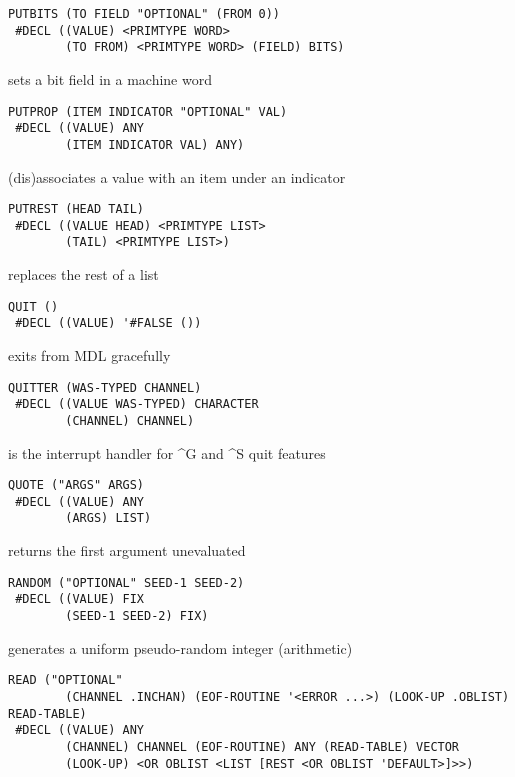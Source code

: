 \documentclass[a4paper]{scrbook}
\begin{document}
\begin{verbatim}
PUTBITS (TO FIELD "OPTIONAL" (FROM 0))
 #DECL ((VALUE) <PRIMTYPE WORD>
        (TO FROM) <PRIMTYPE WORD> (FIELD) BITS)
\end{verbatim}

sets a bit field in a machine word

\begin{verbatim}
PUTPROP (ITEM INDICATOR "OPTIONAL" VAL)
 #DECL ((VALUE) ANY
        (ITEM INDICATOR VAL) ANY)
\end{verbatim}

(dis)associates a value with an item under an indicator

\begin{verbatim}
PUTREST (HEAD TAIL)
 #DECL ((VALUE HEAD) <PRIMTYPE LIST>
        (TAIL) <PRIMTYPE LIST>)
\end{verbatim}

replaces the rest of a list

\begin{verbatim}
QUIT ()
 #DECL ((VALUE) '#FALSE ())
\end{verbatim}

exits from MDL gracefully

\begin{verbatim}
QUITTER (WAS-TYPED CHANNEL)
 #DECL ((VALUE WAS-TYPED) CHARACTER
        (CHANNEL) CHANNEL)
\end{verbatim}

is the interrupt handler for \^{}G and \^{}S quit features

\begin{verbatim}
QUOTE ("ARGS" ARGS)
 #DECL ((VALUE) ANY
        (ARGS) LIST)
\end{verbatim}

returns the first argument unevaluated

\begin{verbatim}
RANDOM ("OPTIONAL" SEED-1 SEED-2)
 #DECL ((VALUE) FIX
        (SEED-1 SEED-2) FIX)
\end{verbatim}

generates a uniform pseudo-random integer (arithmetic)

\begin{verbatim}
READ ("OPTIONAL"
        (CHANNEL .INCHAN) (EOF-ROUTINE '<ERROR ...>) (LOOK-UP .OBLIST) READ-TABLE)
 #DECL ((VALUE) ANY
        (CHANNEL) CHANNEL (EOF-ROUTINE) ANY (READ-TABLE) VECTOR
        (LOOK-UP) <OR OBLIST <LIST [REST <OR OBLIST 'DEFAULT>]>>)
\end{verbatim}
\end{document}
